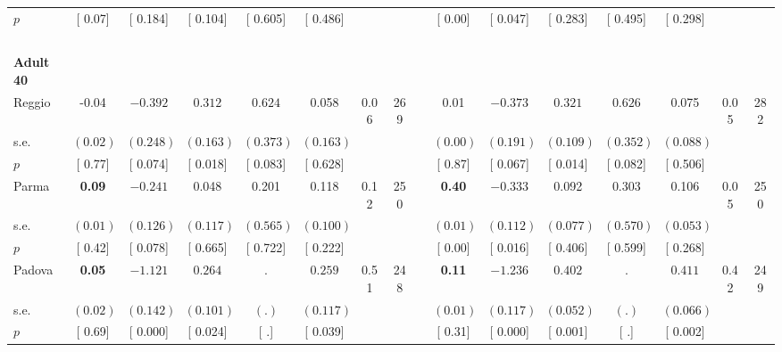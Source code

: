 \begin{longtable}{L{8em} c c c c c c c p{1em} c c c c c c c}
\quad \quad \quad \quad $ p$ & [     0.07] & [    0.184] & [    0.104] & [    0.605] & [    0.486] & & & & [     0.00] & [    0.047] & [    0.283] & [    0.495] & [    0.298] & &  \\[1em]
~\\[1em]
\quad \quad \textbf{Adult 40} & & & & & & & & & & & & & & & \\* 
\quad \quad \quad Reggio& -0.04 & $ \mathbf{   -0.392}$ & $ \mathbf{    0.312}$ & $ \mathbf{    0.624}$ &     0.058 &      0.06 &       269 & & 0.01 & $ \mathbf{   -0.373}$ & $ \mathbf{    0.321}$ & $ \mathbf{    0.626}$ &     0.075 &      0.05 &       282  \\*
\quad \quad \quad \quad s.e.& $ (     0.02)$ & $ (    0.248)$ & $ (    0.163)$ & $ (    0.373)$ & $ (    0.163)$ & & & & $ (     0.00)$ & $ (    0.191)$ & $ (    0.109)$ & $ (    0.352)$ & $ (    0.088)$ & &  \\*
\quad \quad \quad \quad $ p$ & [     0.77] & [    0.074] & [    0.018] & [    0.083] & [    0.628] & & & & [     0.87] & [    0.067] & [    0.014] & [    0.082] & [    0.506] & &  \\[1em]
\quad \quad \quad Parma& \textbf{     0.09} & $ \mathbf{   -0.241}$ &     0.048 &     0.201 &     0.118 &      0.12 &       250 & & \textbf{     0.40} & $ \mathbf{   -0.333}$ &     0.092 &     0.303 &     0.106 &      0.05 &       250  \\*
\quad \quad \quad \quad s.e.& $ (     0.01)$ & $ (    0.126)$ & $ (    0.117)$ & $ (    0.565)$ & $ (    0.100)$ & & & & $ (     0.01)$ & $ (    0.112)$ & $ (    0.077)$ & $ (    0.570)$ & $ (    0.053)$ & &  \\*
\quad \quad \quad \quad $ p$ & [     0.42] & [    0.078] & [    0.665] & [    0.722] & [    0.222] & & & & [     0.00] & [    0.016] & [    0.406] & [    0.599] & [    0.268] & &  \\[1em]
\quad \quad \quad Padova& \textbf{     0.05} & $ \mathbf{   -1.121}$ & $ \mathbf{    0.264}$ &         . & $ \mathbf{    0.259}$ &      0.51 &       248 & & \textbf{     0.11} & $ \mathbf{   -1.236}$ & $ \mathbf{    0.402}$ &         . & $ \mathbf{    0.411}$ &      0.42 &       249  \\*
\quad \quad \quad \quad s.e.& $ (     0.02)$ & $ (    0.142)$ & $ (    0.101)$ & $ (        .)$ & $ (    0.117)$ & & & & $ (     0.01)$ & $ (    0.117)$ & $ (    0.052)$ & $ (        .)$ & $ (    0.066)$ & &  \\*
\quad \quad \quad \quad $ p$ & [     0.69] & [    0.000] & [    0.024] & [        .] & [    0.039] & & & & [     0.31] & [    0.000] & [    0.001] & [        .] & [    0.002] & &  \\[1em]

\end{longtable}
